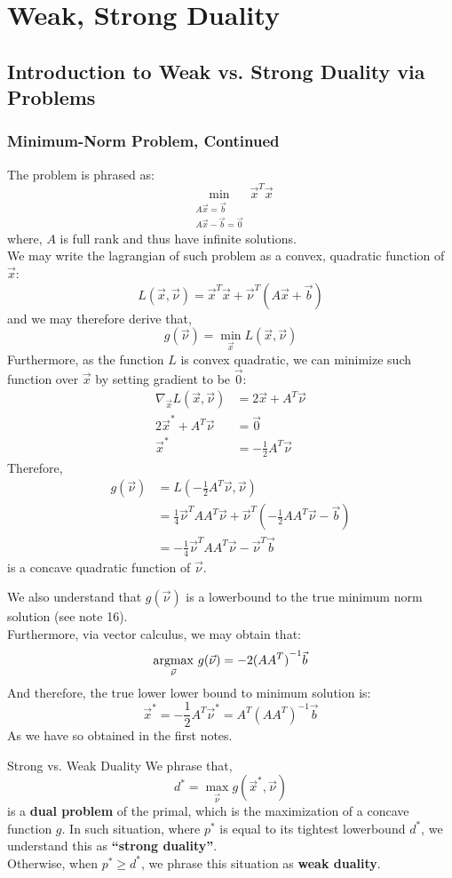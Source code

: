 \chapter{Weak, Strong Duality}

\section{Introduction to Weak vs. Strong Duality via Problems}
\subsection{Minimum-Norm Problem, Continued}
The problem is phrased as:
\[
    \min_{\substack{A \vec{x} = \vec{b} \\ A \vec{x} - \vec{b} = \vec{0}}} \vec{x}^T \vec{x}
\]
where, $A$ is full rank and thus have infinite solutions. \\
We may write the lagrangian of such problem as a convex, quadratic function of $\vec{x}$:
\[
    L(\vec{x}, \vec{\nu}) = \vec{x}^T \vec{x} + {\vec{\nu}}^T (A\vec{x} + \vec{b})
\]
and we may therefore derive that,
\[
    g(\vec{\nu}) = \min_{\vec{x}} L(\vec{x}, \vec{\nu})
\]
Furthermore, as the function $L$ is convex quadratic, we can minimize such function over $\vec{x}$ by setting gradient to be $\vec{0}$:
\begin{align*}
    \nabla_{\vec{x}} L(\vec{x}, \vec{\nu})
    &= 2 \vec{x} + A^T \vec{\nu} \\
    2 \vec{x}^* + A^T \vec{\nu} &= \vec{0} \\
    \vec{x}^* &= -\frac{1}{2} A^T \vec{\nu}
\end{align*}
Therefore,
\begin{align*}
    g(\vec{\nu}) &= L(-\frac{1}{2} A^T \vec{\nu}, \vec{\nu}) \\
    &= \frac{1}{4} \vec{\nu}^T A A^T \vec{\nu} + \vec{\nu}^T (-\frac{1}{2} A A^T \vec{\nu} - \vec{b}) \\
    &= - \frac{1}{4} \vec{\nu}^T A A^T \vec{\nu} - \vec{\nu}^T \vec{b}
\end{align*}
is a concave quadratic function of $\vec{\nu}$.

We also understand that $g(\vec{\nu})$ is a lowerbound to the true minimum norm solution (see note 16). \\
Furthermore, via vector calculus, we may obtain that:
\[
    \underset{\vec{\nu}}{\rm argmax}\ g(\vec{\nu}) = -2 {(A A^T)}^{-1} \vec{b}
\]
And therefore, the true lower lower bound to minimum solution is:
\[
    \vec{x}^* = -\frac{1}{2} A^T \vec{\nu}^* = A^T {(A A^T)}^{-1} \vec{b}
\]
As we have so obtained in the first notes. \\
\begin{ln-define}{Strong vs. Weak Duality}{}
    We phrase that,
    \[
        d^* = \max_{\vec{\nu}} g(\vec{x}^*, \vec{\nu})
    \]
    is a \textbf{dual problem} of the primal, which is the maximization of a concave function $g$.
    In such situation, where $p^*$ is equal to its tightest lowerbound $d^*$, we understand this as \textbf{``strong duality''}. \\
    Otherwise, when $p^* \geq d^*$, we phrase this situation as \textbf{weak duality}.
\end{ln-define}

